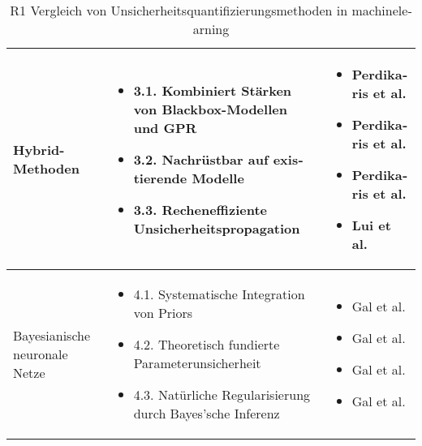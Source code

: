 \begin{otherlanguage}{ngerman}
\begin{table}[!htpb]
\begin{tabularx}{\textwidth}{|l|X|X|}
    \multirow{7}{*}{Hybrid-Methoden} &
    \begin{itemize}[topsep=0em, itemsep=0em, leftmargin=*, label={}]
      \item 3.1. Kombiniert Stärken von Blackbox-Modellen und GPR
      \item 3.2. Nachrüstbar auf existierende Modelle
      \item 3.3. Recheneffiziente Unsicherheitspropagation
    \end{itemize}
    &
    \begin{itemize}[topsep=0em, itemsep=0em, leftmargin=*, label={}]
      \item Perdikaris et al. \parencite{perdikaris2017nonlinear}
      \item Perdikaris et al. \parencite[S.~5–6]{perdikaris2017nonlinear}
      \item Perdikaris et al. \parencite[S.~6]{perdikaris2017nonlinear}
      \item Lui et al. \parencite{liu2020multifidelity}
    \end{itemize}
    \\ \hline

    \multirow{7}{*}{\gls{Bayesianische neuronale Netze}} &
    \begin{itemize}[topsep=0em, itemsep=0em, leftmargin=*, label={}]
      \item 4.1. Systematische Integration von Priors
      \item 4.2. Theoretisch fundierte Parameterunsicherheit
      \item 4.3. Natürliche Regularisierung durch Bayes'sche Inferenz
    \end{itemize}
    &
    \begin{itemize}[topsep=0em, itemsep=0em, leftmargin=*, label={}]
      \item Gal et al. \parencite{gal2016uncertainty}
      \item Gal et al. \parencite[Kap.~2.3]{gal2016uncertainty}
      \item Gal et al. \parencite[S.~40–41]{gal2016uncertainty}
      \item Gal et al. \parencite[S.~41–42]{gal2016uncertainty}
    \end{itemize}
    \\ \hline
    
  \end{tabularx}
  \caption{R1 Vergleich von Unsicherheitsquantifizierungsmethoden in \gls{machinelearning}}
  \label{tab:chapter6r1}
\end{table}


\end{otherlanguage}
